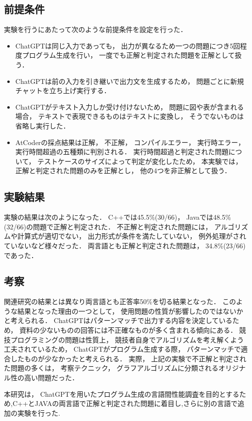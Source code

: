 \documentclass[a4j,twocolumn,9pt]{jarticle}
\begin{document}
\subsection{前提条件}
実験を行うにあたって次のような前提条件を設定を行った． 
\begin{itemize}
  \item ChatGPTは同じ入力であっても， 出力が異なるため一つの問題につき5回程度プログラム生成を行い， 一度でも正解と判定された問題を正解として扱う． 
  \item ChatGPTは前の入力を引き継いで出力文を生成するため， 問題ごとに新規チャットを立ち上げ実行する． 
  \item ChatGPTがテキスト入力しか受け付けないため， 問題に図や表が含まれる場合， テキストで表現できるものはテキストに変換し， そうでないものは省略し実行した． 
  \item AtCoderの採点結果は正解， 不正解， コンパイルエラー， 実行時エラー， 実行時間超過の五種類に判別される． 実行時間超過と判定された問題について， テストケースのサイズによって判定が変化したため， 本実験では， 正解と判定された問題のみを正解とし， 他の4つを非正解として扱う． 
\end{itemize}
\subsection{実験結果}
実験の結果は次のようになった． 
C++では45.5\%(30/66)，  Javaでは48.5\%(32/66)の問題で正解と判定された． 
不正解と判定された問題には， アルゴリズムや計算式が適切でない， 出力形式が条件を満たしていない， 例外処理がされていないなど様々だった． 
両言語とも正解と判定された問題は， 34.8\%(23/66)であった． 
\subsection{考察}
関連研究の結果とは異なり両言語とも正答率50\%を切る結果となった． 
このような結果となった理由の一つとして， 使用問題の性質が影響したのではないかと考えられる．
ChatGPTはパターンマッチで出力する内容を決定しているため， 資料の少ないものの回答には不正確なものが多く含まれる傾向にある．  
競技プログラミングの問題は性質上， 競技者自身でアルゴリズムを考え解くよう工夫されているため， ChatGPTがプログラム生成する際， パターンマッチで適合したものが少なかったと考えられる． 
実際， 上記の実験で不正解と判定された問題の多くは， 考察テクニック， グラフアルゴリズムに分類されるオリジナル性の高い問題だった．

本研究は， ChatGPTを用いたプログラム生成の言語間性能調査を目的とするため,C++とJAVAの両言語で正解と判定された問題に着目し,さらに別の言語で追加の実験を行った.
\end{document}
